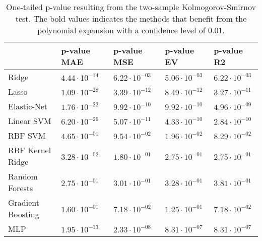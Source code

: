 
\begin{table}
\begin{tabular}{lllll}
\toprule
{} & p-value MAE & p-value MSE & p-value EV & p-value R2 \\
\midrule
Ridge              &    $4.44\cdot 10^{-14}$ &    $6.22\cdot 10^{-03}$ &   $5.06\cdot 10^{-03}$ &   $6.22\cdot 10^{-03}$ \\
Lasso              &    $1.09\cdot 10^{-28}$ &    $3.39\cdot 10^{-12}$ &   $8.49\cdot 10^{-12}$ &   $3.27\cdot 10^{-11}$ \\
Elastic-Net        &    $1.76\cdot 10^{-22}$ &    $9.92\cdot 10^{-10}$ &   $9.92\cdot 10^{-10}$ &   $4.96\cdot 10^{-09}$ \\
Linear SVM         &    $6.20\cdot 10^{-26}$ &    $5.07\cdot 10^{-11}$ &   $4.33\cdot 10^{-10}$ &   $2.84\cdot 10^{-10}$ \\
RBF SVM            &    $4.65\cdot 10^{-01}$ &    $9.54\cdot 10^{-02}$ &   $1.96\cdot 10^{-02}$ &   $8.29\cdot 10^{-02}$ \\
RBF Kernel Ridge   &    $3.28\cdot 10^{-02}$ &    $1.80\cdot 10^{-01}$ &   $2.75\cdot 10^{-01}$ &   $2.75\cdot 10^{-01}$ \\
Random Forests     &    $2.75\cdot 10^{-01}$ &    $3.01\cdot 10^{-01}$ &   $3.28\cdot 10^{-01}$ &   $3.81\cdot 10^{-01}$ \\
Gradient Boosting  &    $1.60\cdot 10^{-01}$ &    $7.18\cdot 10^{-02}$ &   $1.25\cdot 10^{-01}$ &   $7.18\cdot 10^{-02}$ \\
MLP                &    $1.95\cdot 10^{-13}$ &    $2.33\cdot 10^{-08}$ &   $8.31\cdot 10^{-07}$ &   $8.31\cdot 10^{-07}$ \\
\bottomrule
\end{tabular}
\caption{One-tailed p-value resulting from the two-sample Kolmogorov-Smirnov test. The bold values indicates the methods that benefit from the polynomial expansion with a confidence level of $0.01$.}
\end{table}






